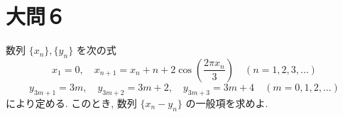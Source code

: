 \documentclass[dvipdfmx,a4paper]{jsarticle}
\newcommand{\2}{I\hspace{-1pt}I}
\newcommand{\3}{I\hspace{-1pt}I\hspace{-1pt}I}
\begin{document}
    \section{大問６}
    数列 $\{x_n\}, \{y_n\}$ を次の式
    \[
        x_1 = 0, \quad x_{n+1} = x_n + n + 2\cos\left( \frac{2\pi x_n}{3} \right) \quad (n=1, 2, 3, \ldots)
    \]
    \[
        y_{3m+1} = 3m, \quad y_{3m+2} = 3m+2, \quad y_{3m+3} = 3m+4 \quad (m=0, 1, 2, \ldots)
    \]
    により定める. このとき, 数列 $\{x_n - y_n\}$ の一般項を求めよ. 
\end{document}
